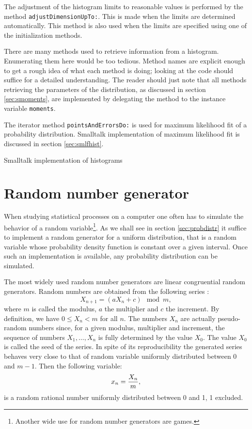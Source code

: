 The adjustment of the histogram limits to reasonable values is
performed by the method {\tt adjustDimensionUpTo:}. This is made
when the limits are determined automatically. This method is also
used when the limits are specified using one of the initialization
methods.

There are many methods used to retrieve information from a
histogram. Enumerating them here would be too tedious. Method
names are explicit enough to get a rough idea of what each method
is doing; looking at the code should suffice for a detailed
understanding. The reader should just note that all methods
retrieving the parameters of the distribution, as discussed in
section \ref{sec:smoments}, are implemented by delegating the
method to the instance variable {\tt moments}.

The iterator method {\tt pointsAndErrorsDo:} is used for maximum
likelihood fit of a probability distribution. Smalltalk
implementation of maximum likelihood fit is discussed in section
\ref{sec:smlfhist}.

\begin{listing} Smalltalk implementation of histograms \label{ls:histogram}

\end{listing}


\section{Random number generator}
\label{sec:random} When studying statistical processes on a
computer one often has to simulate the behavior of a random
variable\footnote{Another wide use for random number generators
are games.}. As we shall see in section \ref{sec:probdistr} it
suffice to implement a random generator for a uniform
distribution, that is a random variable whose probability density
function is constant over a given interval. Once such an
implementation is available, any probability distribution can be
simulated.

 The most widely
used random number generators are linear congruential random
generators. Random numbers are obtained from the following series
\cite{Knuth2}:
\begin{equation}
\label{eq:crg}
  X_{n+1} = \left(aX_n+c\right) \mod m,
\end{equation}
where $m$ is called the modulus, $a$ the multiplier and $c$ the
increment. By definition, we have $0\leq X_n<m$ for all $n$. The
numbers $X_n$ are actually pseudo-random numbers since, for a
given modulus, multiplier and increment, the sequence of numbers
$X_1,\ldots,X_n$ is fully determined by the value $X_0$. The value
$X_0$ is called the seed of the series. In spite of its
reproducibility the generated series behaves very close to that of
random variable uniformly distributed between 0 and $m-1$. Then
the following variable:
\begin{equation}
  x_n = {X_n \over m},
\end{equation}
is a random rational number uniformly distributed between 0 and 1,
1 excluded.

